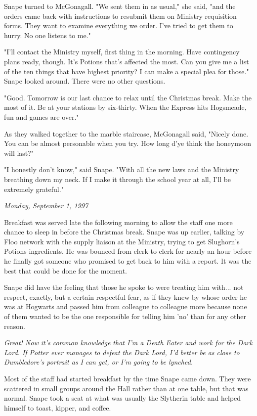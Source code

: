 \documentclass[a4paper,11pt]{article}
\begin{document}
Snape turned to McGonagall. "We sent them in as usual," she said, "and the orders came back with instructions to resubmit them on Ministry requisition forms. They want to examine everything we order. I've tried to get them to hurry. No one listens to me."

"I'll contact the Ministry myself, first thing in the morning. Have contingency plans ready, though. It's Potions that's affected the most. Can you give me a list of the ten things that have highest priority? I can make a special plea for those." Snape looked around. There were no other questions.

"Good. Tomorrow is our last chance to relax until the Christmas break. Make the most of it. Be at your stations by six-thirty. When the Express hits Hogsmeade, fun and games are over."

As they walked together to the marble staircase, McGonagall said, "Nicely done. You can be almost personable when you try. How long d'ye think the honeymoon will last?"

"I honestly don't know," said Snape. "With all the new laws and the Ministry breathing down my neck. If I make it through the school year at all, I'll be extremely grateful."

\emph{Monday, September 1, 1997}

Breakfast was served late the following morning to allow the staff one more chance to sleep in before the Christmas break. Snape was up earlier, talking by Floo network with the supply liaison at the Ministry, trying to get Slughorn's Potions ingredients. He was bounced from clerk to clerk for nearly an hour before he finally got someone who promised to get back to him with a report. It was the best that could be done for the moment.

Snape did have the feeling that those he spoke to were treating him with... not respect, exactly, but a certain respectful fear, as if they knew by whose order he was at Hogwarts and passed him from colleague to colleague more because none of them wanted to be the one responsible for telling him 'no' than for any other reason.

\emph{Great! Now it's common knowledge that I'm a Death Eater and work for the Dark Lord. If Potter ever manages to defeat the Dark Lord, I'd better be as close to Dumbledore's portrait as I can get, or I'm going to be lynched.}

Most of the staff had started breakfast by the time Snape came down. They were scattered in small groups around the Hall rather than at one table, but that was normal. Snape took a seat at what was usually the Slytherin table and helped himself to toast, kipper, and coffee.
\end{document}
